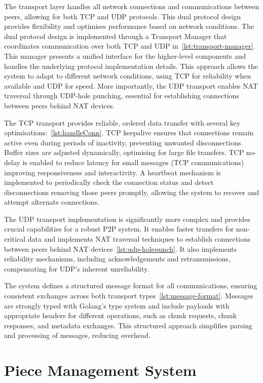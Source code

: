 \documentclass[12pt,a4paper]{report}
\begin{document}
The transport layer handles all network connections and communications between peers, allowing for both TCP and UDP protocols. This dual protocol design provides flexibility and optimises performance based on network conditions. The dual protocol design is implemented through a Transport Manager that coordinates communication over both TCP and UDP in~\ref{lst:transport-manager}. This manager presents a unified interface for the higher-level components and handles the underlying protocol implementation details. This approach allows the system to adapt to different network conditions, using TCP for reliability when available and UDP for speed. More importantly, the UDP transport enables NAT traversal through UDP-hole punching, essential for establishing connections between peers behind NAT devices.

The TCP transport provides reliable, ordered data transfer with several key optimisations:~\ref{lst:handleConn}. TCP keepalive ensures that connections remain active even during periods of inactivity, preventing unwanted disconnections. Buffer sizes are adjusted dynamically, optimising for large file transfers. TCP no-delay is enabled to reduce latency for small messages (TCP communications) improving responsiveness and interactivity. A heartbeat mechanism is implemented to periodically check the connection status and detect disconnections removing those peers promptly, allowing the system to recover and attempt alternate connections.

The UDP transport implementation is significantly more complex and provides crucial capabilities for a robust P2P system. It enables faster transfers for non-critical data and implements NAT traversal techniques to establish connections between peers behind NAT devices~\ref{lst:udp-holepunch}. It also implements reliability mechanisms, including acknowledgements and retransmissions, compensating for UDP's inherent unreliability.

The system defines a structured message format for all communications, ensuring consistent exchanges across both transport types~\ref{lst:message-format}. Messages are strongly typed with Golang's type system and include payloads with appropriate headers for different operations, such as chunk requests, chunk responses, and metadata exchanges. This structured approach simplifies parsing and processing of messages, reducing overhead.

\section{Piece Management System}
\end{document}
